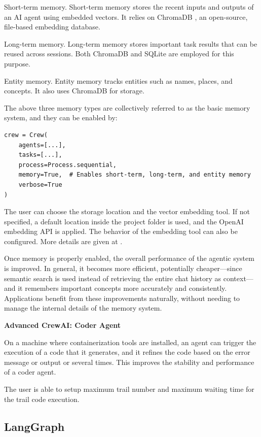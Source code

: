 Short-term memory. Short-term memory stores the recent inputs and outputs of an AI agent using embedded vectors. It relies on ChromaDB \cite{chroma2025chroma}, an open-source, file-based embedding database.

Long-term memory. Long-term memory stores important task results that can be reused across sessions. Both ChromaDB and SQLite are employed for this purpose.

Entity memory. Entity memory tracks entities such as names, places, and concepts. It also uses ChromaDB for storage.

The above three memory types are collectively referred to as the basic memory system, and they can be enabled by:
\begin{lstlisting}
crew = Crew(
    agents=[...],
    tasks=[...],
    process=Process.sequential,
    memory=True,  # Enables short-term, long-term, and entity memory
    verbose=True
)
\end{lstlisting}

The user can choose the storage location and the vector embedding tool. If not specified, a default location inside the project folder is used, and the OpenAI embedding API is applied. The behavior of the embedding tool can also be configured. More details are given at \cite{crewai2025memory}.

Once memory is properly enabled, the overall performance of the agentic system is improved. In general, it becomes more efficient, potentially cheaper—since semantic search is used instead of retrieving the entire chat history as context—and it remembers important concepts more accurately and consistently. Applications benefit from these improvements naturally, without needing to manage the internal details of the memory system.

\vspace{0.1in}
\noindent \textbf{Advanced CrewAI: Coder Agent}
\vspace{0.1in}

On a machine where containerization tools are installed, an agent can trigger the execution of a code that it generates, and it refines the code based on the error message or output or several times. This improves the stability and performance of a coder agent.

The user is able to setup maximum trail number and maximum waiting time for the trail code execution.

\subsection{LangGraph}

